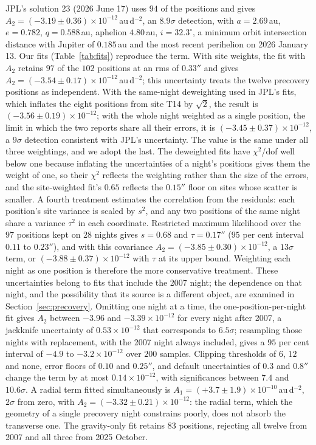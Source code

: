 \documentclass[3p,11pt]{elsarticle}
\begin{document}
JPL's solution 23 (2026 June 17) uses $94$ of the positions and gives
$A_2=(-3.19\pm0.36)\times10^{-12}$\,au\,d$^{-2}$, an $8.9\sigma$ detection, with
$a=2.69$\,au, $e=0.782$, $q=0.588$\,au, aphelion $4.80$\,au, $i=32.3^\circ$, a minimum
orbit intersection distance with Jupiter of $0.185$\,au and the most recent perihelion on
2026 January 13. Our fits (Table~\ref{tab:fits}) reproduce the term. With site weights,
the fit with $A_2$ retains $97$ of the $102$ positions at an rms of $0.33''$ and gives
$A_2=(-3.54\pm0.17)\times10^{-12}$\,au\,d$^{-2}$; this uncertainty treats the twelve
precovery positions as independent. With the same-night deweighting used in JPL's fits,
which inflates the eight positions from site T14 by $\sqrt{2}$, the result is
$(-3.56\pm0.19)\times10^{-12}$; with the whole night weighted as a single position, the
limit in which the two reports share all their errors, it is
$(-3.45\pm0.37)\times10^{-12}$, a $9\sigma$ detection consistent with JPL's uncertainty.
The value is the same under all three weightings, and we adopt the last. The deweighted
fits have $\chi^2$/dof well below one because inflating the uncertainties of a night's
positions gives them the weight of one, so their $\chi^2$ reflects the weighting rather
than the size of the errors, and the site-weighted fit's $0.65$ reflects the $0.15''$
floor on sites whose scatter is smaller. A fourth treatment estimates the correlation from
the residuals: each position's site variance is scaled by $s^2$, and any two positions of
the same night share a variance $\tau^2$ in each coordinate. Restricted maximum likelihood
over the $97$ positions kept on $28$ nights gives $s=0.68$ and $\tau=0.17''$ ($95$ per cent
interval $0.11$ to $0.23''$), and with this covariance
$A_2=(-3.85\pm0.30)\times10^{-12}$, a $13\sigma$ term, or
$(-3.88\pm0.37)\times10^{-12}$ with $\tau$ at its upper bound. Weighting each night as one
position is therefore the more conservative treatment. These uncertainties belong to fits
that include the 2007 night; the dependence on that night, and the possibility that its
source is a different object, are examined in Section~\ref{sec:precovery}. Omitting one night at a time, the
one-position-per-night fit gives $A_2$ between $-3.96$ and $-3.39\times10^{-12}$ for every
night after 2007, a jackknife uncertainty of $0.53\times10^{-12}$ that corresponds to
$6.5\sigma$; resampling those nights with replacement, with the 2007 night always included,
gives a $95$ per cent interval of $-4.9$ to $-3.2\times10^{-12}$ over $200$ samples.
Clipping thresholds of $6$, $12$ and none, error floors of $0.10$ and $0.25''$, and
default uncertainties of $0.3$ and $0.8''$ change the term by at most
$0.14\times10^{-12}$, with significances between $7.4$ and $10.6\sigma$. A radial term
fitted simultaneously is $A_1=(+3.7\pm1.9)\times10^{-10}$\,au\,d$^{-2}$, $2\sigma$ from
zero, with $A_2=(-3.32\pm0.21)\times10^{-12}$: the radial term, which the geometry of a
single precovery night constrains poorly, does not absorb the transverse one. The
gravity-only fit retains $83$ positions, rejecting all twelve from 2007 and all three
from 2025 October.
\end{document}
